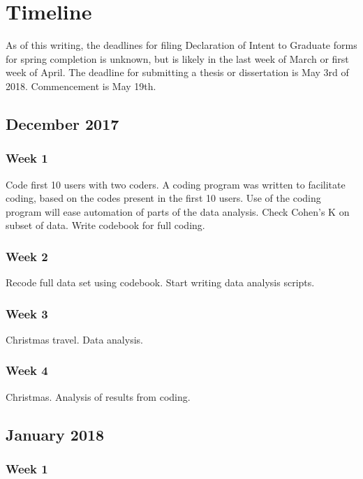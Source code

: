 \chapter{Timeline}

As of this writing, the deadlines for filing Declaration of Intent to Graduate forms for spring completion is unknown, but is likely in the last week of March or first week of April. 
The deadline for submitting a thesis or dissertation is May 3rd of 2018. 
Commencement is May 19th. 

\section{December 2017}

\subsection{Week 1}

Code first 10 users with two coders. A coding program was written to facilitate coding, based on the codes present in the first 10 users. Use of the coding program will ease automation of parts of the data analysis. 
Check Cohen's K on subset of data.
Write codebook for full coding. 

\subsection{Week 2}

Recode full data set using codebook.
Start writing data analysis scripts.

\subsection{Week 3}

Christmas travel. 
Data analysis.

\subsection{Week 4}

Christmas. 
Analysis of results from coding.

\section{January 2018}

\subsection{Week 1}

